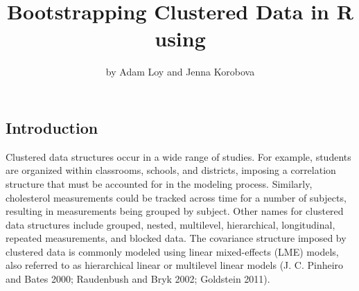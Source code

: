 \title{Bootstrapping Clustered Data in R using }
\author{by Adam Loy and Jenna Korobova}

\maketitle


\hypertarget{introduction}{%
\subsection{Introduction}\label{introduction}}

Clustered data structures occur in a wide range of studies. For example, students are organized within classrooms, schools, and districts, imposing a correlation structure that must be accounted for in the modeling process. Similarly, cholesterol measurements could be tracked across time for a number of subjects, resulting in measurements being grouped by subject. Other names for clustered data structures include grouped, nested, multilevel, hierarchical, longitudinal, repeated measurements, and blocked data. The covariance structure imposed by clustered data is commonly modeled using linear mixed-effects (LME) models, also referred to as hierarchical linear or multilevel linear models (J. C. Pinheiro and Bates 2000; Raudenbush and Bryk 2002; Goldstein 2011).

